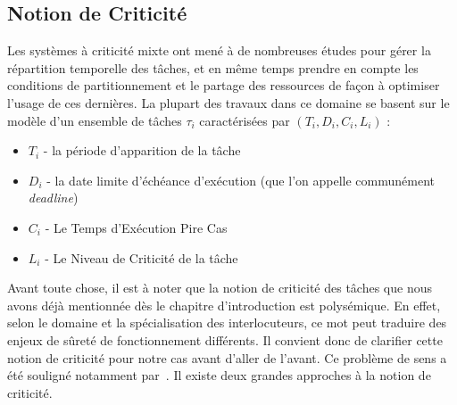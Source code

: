 \documentclass[french, a4paper, 11pt, twoside, pdftex]{StyleThese}
\begin{document}
    
    \subsection{Notion de Criticité}
    	
    Les systèmes à criticité mixte ont mené à de nombreuses études pour gérer la répartition temporelle des tâches, et en même temps prendre en compte les conditions de partitionnement et le partage des ressources de façon à optimiser l'usage de ces dernières. La plupart des travaux dans ce domaine se basent sur le modèle d'un ensemble de tâches $\tau_i$ caractérisées par $ (T_i,D_i,C_i,L_i) $ : 
    \begin{itemize}
    	\item $T_i$ - la période d'apparition de la tâche
    	\item $D_i$ - la date limite d'échéance d'exécution (que l'on appelle communément \textit{deadline})
    	\item $C_i$ - Le Temps d'Exécution Pire Cas %
    	\item $L_i$ - Le Niveau de Criticité de la tâche
    \end{itemize}
     
    Avant toute chose, il est à noter que la notion de criticité des tâches que nous avons déjà mentionnée dès le chapitre d'introduction est polysémique. En effet, selon le domaine et la spécialisation des interlocuteurs, ce mot peut traduire des enjeux de sûreté de fonctionnement différents. Il convient donc de clarifier cette notion de criticité pour notre cas avant d'aller de l'avant. Ce problème de sens a été souligné notamment par~\cite{graydon_safety_2013}. Il existe deux grandes approches à la notion de criticité. 
    
\end{document}
